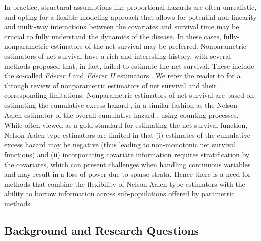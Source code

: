 \documentclass[12pt]{article}
\begin{document}
In practice, structural assumptions like proportional hazards are often unrealistic, and opting for a flexible modeling approach that allows for potential non-linearity and multi-way interactions between the covariates and survival time may be crucial to fully understand the dynamics of the disease. In these cases, fully-nonparametric estimators of the net survival may be preferred. Nonparametric estimators of net survival have a rich and interesting history, with several methods proposed that, in fact, failed to estimate the net survival. These include the so-called \textit{Ederer I} and \textit{Ederer II} estimators \citep{ederer:1961}. We refer the reader to \cite{perme:2012} for a through review of nonparametric estimators of net survival and their corresponding limitations. Nonparametric estimators of net survival are based on estimating the cumulative excess hazard \citep{perme:2012}, in a similar fashion as the Nelson-Aalen estimator of the overall cumulative hazard \citep{aalen:1978}, using counting processes. While often viewed as a gold-standard for estimating the net survival function, Nelson-Aalen type estimators are limited in that (i) estimates of the cumulative excess hazard may be negative (thus leading to non-monotonic net survival functions) and (ii) incorporating covariate information requires stratification by the covariates, which can present challenges when handling continuous variables and may result in a loss of power due to sparse strata. Hence there is a need for methods that combine the flexibility of Nelson-Aalen type estimators with the ability to borrow information across sub-populations offered by parametric methods.

\subsection{Background and Research Questions}
\end{document}
